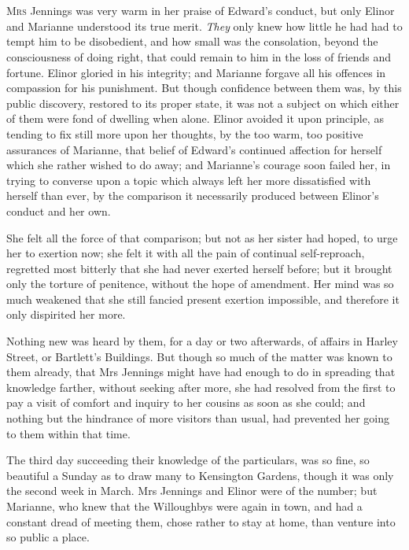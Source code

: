 \chapter[Chapter \thechapter]{}
\lettrine[lraise=0.3]{M}{rs} Jennings was very warm in her praise of Edward's conduct, but only Elinor and Marianne understood its true merit. \textit{They} only knew how little he had had to tempt him to be disobedient, and how small was the consolation, beyond the consciousness of doing right, that could remain to him in the loss of friends and fortune. Elinor gloried in his integrity; and Marianne forgave all his offences in compassion for his punishment. But though confidence between them was, by this public discovery, restored to its proper state, it was not a subject on which either of them were fond of dwelling when alone. Elinor avoided it upon principle, as tending to fix still more upon her thoughts, by the too warm, too positive assurances of Marianne, that belief of Edward's continued affection for herself which she rather wished to do away; and Marianne's courage soon failed her, in trying to converse upon a topic which always left her more dissatisfied with herself than ever, by the comparison it necessarily produced between Elinor's conduct and her own.

She felt all the force of that comparison; but not as her sister had hoped, to urge her to exertion now; she felt it with all the pain of continual self-reproach, regretted most bitterly that she had never exerted herself before; but it brought only the torture of penitence, without the hope of amendment. Her mind was so much weakened that she still fancied present exertion impossible, and therefore it only dispirited her more.

Nothing new was heard by them, for a day or two afterwards, of affairs in Harley Street, or Bartlett's Buildings. But though so much of the matter was known to them already, that Mrs Jennings might have had enough to do in spreading that knowledge farther, without seeking after more, she had resolved from the first to pay a visit of comfort and inquiry to her cousins as soon as she could; and nothing but the hindrance of more visitors than usual, had prevented her going to them within that time.

The third day succeeding their knowledge of the particulars, was so fine, so beautiful a Sunday as to draw many to Kensington Gardens, though it was only the second week in March. Mrs Jennings and Elinor were of the number; but Marianne, who knew that the Willoughbys were again in town, and had a constant dread of meeting them, chose rather to stay at home, than venture into so public a place.

